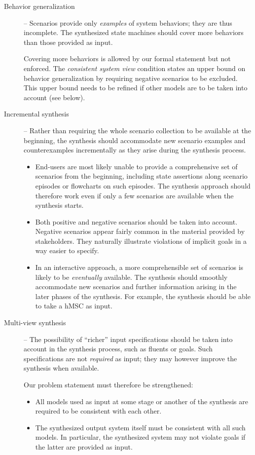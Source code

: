 \begin{description}
\item[Behavior generalization] -- Scenarios provide only \emph{examples} of system behaviors; they are thus incomplete. The synthesized state machines should cover more behaviors than those provided as input. 

Covering more behaviors is allowed by our formal statement but not enforced. The \emph{consistent system view} condition states an upper bound on behavior generalization by requiring negative scenarios to be excluded. This upper bound needs to be refined if other models are to be taken into account (see below).

\item[Incremental synthesis] -- Rather than requiring the whole scenario collection to be available at the beginning, the synthesis should accommodate new scenario examples and counterexamples incrementally as they arise during the synthesis process.
\begin{itemize}

\item End-users are most likely unable to provide a comprehensive set of scenarios from the beginning, including state assertions along scenario episodes or flowcharts on such episodes. The synthesis approach should therefore work even if only a few scenarios are available when the synthesis starts.

\item Both positive and negative scenarios should be taken into account. Negative scenarios appear fairly common in the material provided by stakeholders. They naturally illustrate violations of implicit goals in a way easier to specify.

\item In an interactive approach, a more comprehensible set of scenarios is likely to be \emph{eventually} available. The synthesis should smoothly accommodate new scenarios and further information arising in the later phases of the synthesis. For example, the synthesis should be able to take a hMSC as input. 

\end{itemize}

\item[Multi-view synthesis] -- The possibility of ``richer'' input specifications should be taken into account in the synthesis process, such as fluents or goals. Such specifications are not \emph{required} as input; they may however improve the synthesis when available. 

\noindent Our problem statement must therefore be strengthened: 
\begin{itemize}
\item All models used as input at some stage or another of the synthesis are required to be consistent with each other. 
\item The synthesized output system itself must be consistent with all such models. In particular, the synthesized system may not violate goals if the latter are provided as input.
\end{itemize}

\end{description}

